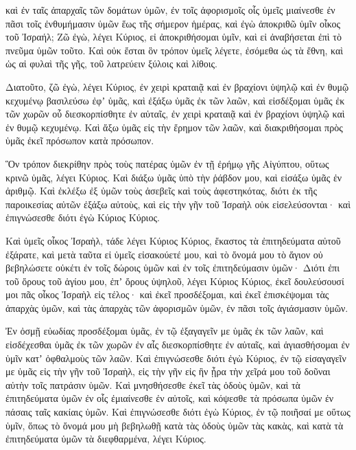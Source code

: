 {καὶ ἐν ταῖς ἀπαρχαῖς τῶν δομάτων ὑμῶν, ἐν τοῖς ἀφορισμοῖς οἷς ὑμεῖς μιαίνεσθε ἐν πᾶσι τοῖς ἐνθυμήμασιν ὑμῶν ἕως τῆς σήμερον ἡμέρας, καὶ ἐγὼ ἀποκριθῶ ὑμῖν οἶκος τοῦ Ἰσραήλ; Ζῶ ἐγὼ, λέγει Κύριος, εἰ ἀποκριθήσομαι ὑμῖν, καὶ εἰ ἀναβήσεται ἐπὶ τὸ πνεῦμα ὑμῶν τοῦτο.
Καὶ οὐκ ἔσται ὃν τρόπον ὑμεῖς λέγετε, ἐσόμεθα ὡς τὰ ἔθνη, καὶ ὡς αἱ φυλαὶ τῆς γῆς, τοῦ λατρεύειν ξύλοις καὶ λίθοις.
\par }{\PP {}Διατοῦτο, ζῶ ἐγὼ, λέγει Κύριος, ἐν χειρὶ κραταιᾷ καὶ ἐν βραχίονι ὑψηλῷ καὶ ἐν θυμῷ κεχυμένῳ βασιλεύσω ἐφʼ ὑμᾶς,
καὶ ἐξάξω ὑμᾶς ἐκ τῶν λαῶν, καὶ εἰσδέξομαι ὑμᾶς ἐκ τῶν χωρῶν οὗ διεσκορπίσθητε ἐν αὐταῖς, ἐν χειρὶ κραταιᾷ καὶ ἐν βραχίονι ὑψηλῷ καὶ ἐν θυμῷ κεχυμένῳ.
Καὶ ἄξω ὑμᾶς εἰς τὴν ἔρημον τῶν λαῶν, καὶ διακριθήσομαι πρὸς ὑμᾶς ἐκεῖ πρόσωπον κατὰ πρόσωπον.
\par }{\PP {}Ὃν τρόπον διεκρίθην πρὸς τοὺς πατέρας ὑμῶν ἐν τῇ ἐρήμῳ γῆς Αἰγύπτου, οὕτως κρινῶ ὑμᾶς, λέγει Κύριος.
Καὶ διάξω ὑμᾶς ὑπὸ τὴν ῥάβδον μου, καὶ εἰσάξω ὑμᾶς ἐν ἀριθμῷ.
Καὶ ἐκλέξω ἐξ ὑμῶν τοὺς ἀσεβεῖς καὶ τοὺς ἀφεστηκότας, διότι ἐκ τῆς παροικεσίας αὐτῶν ἐξάξω αὐτοὺς, καὶ εἰς τὴν γῆν τοῦ Ἰσραὴλ οὐκ εἰσελεύσονται· καὶ ἐπιγνώσεσθε διότι ἐγὼ Κύριος Κύριος.
\par }{\PP {}Καὶ ὑμεῖς οἶκος Ἰσραὴλ, τάδε λέγει Κύριος Κύριος, ἕκαστος τὰ ἐπιτηδεύματα αὐτοῦ ἐξάρατε, καὶ μετὰ ταῦτα εἰ ὑμεῖς εἰσακούετέ μου, καὶ τὸ ὄνομά μου τὸ ἅγιον οὐ βεβηλώσετε οὐκέτι ἐν τοῖς δώροις ὑμῶν καὶ ἐν τοῖς ἐπιτηδεύμασιν ὑμῶν·
Διότι ἐπι τοῦ ὄρους τοῦ ἁγίου μου, ἐπʼ ὄρους ὑψηλοῦ, λέγει Κύριος Κύριος, ἐκεῖ δουλεύσουσί μοι πᾶς οἶκος Ἰσραὴλ εἰς τέλος· καὶ ἐκεῖ προσδέξομαι, καὶ ἐκεῖ ἐπισκέψομαι τὰς ἀπαρχὰς ὑμῶν, καὶ τὰς ἀπαρχὰς τῶν ἀφορισμῶν ὑμῶν, ἐν πᾶσι τοῖς ἁγιάσμασιν ὑμῶν.
\par }{\PP {}Ἐν ὀσμῇ εὐωδίας προσδέξομαι ὑμᾶς, ἐν τῷ ἐξαγαγεῖν με ὑμᾶς ἐκ τῶν λαῶν, καὶ εἰσδέχεσθαι ὑμᾶς ἐκ τῶν χωρῶν ἐν αἷς διεσκορπίσθητε ἐν αὐταῖς, καὶ ἁγιασθήσομαι ἐν ὑμῖν κατʼ ὀφθαλμοὺς τῶν λαῶν.
Καὶ ἐπιγνώσεσθε διότι ἐγὼ Κύριος, ἐν τῷ εἰσαγαγεῖν με ὑμᾶς εἰς τὴν γῆν τοῦ Ἰσραὴλ, εἰς τὴν γῆν εἰς ἣν ᾖρα τὴν χεῖρά μου τοῦ δοῦναι αὐτὴν τοῖς πατράσιν ὑμῶν.
Καὶ μνησθήσεσθε ἐκεῖ τὰς ὁδοὺς ὑμῶν, καὶ τὰ ἐπιτηδεύματα ὑμῶν ἐν οἷς ἐμιαίνεσθε ἐν αὐτοῖς, καὶ κόψεσθε τὰ πρόσωπα ὑμῶν ἐν πάσαις ταῖς κακίαις ὑμῶν.
Καὶ ἐπιγνώσεσθε διότι ἐγὼ Κύριος, ἐν τῷ ποιῆσαί με οὕτως ὑμῖν, ὅπως τὸ ὄνομά μου μὴ βεβηλωθῇ κατὰ τὰς ὁδοὺς ὑμῶν τὰς κακὰς, καὶ κατὰ τὰ ἐπιτηδεύματα ὑμῶν τὰ διεφθαρμένα, λέγει Κύριος.

}
